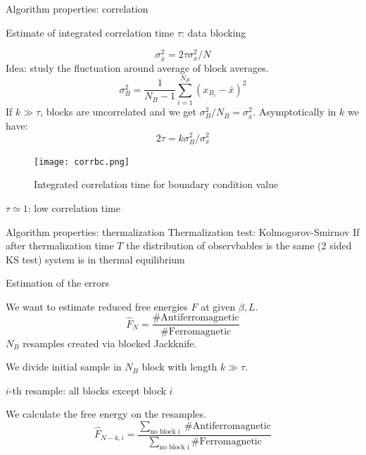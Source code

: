 \documentclass[12pt,handout]{beamer}
\begin{document}
\begin{frame}{Algorithm properties: correlation}
\begin{center}
Estimate of integrated correlation time $\tau$: data blocking

\[
	\sigma_{\bar{x}}^2 = 2\tau\sigma_{x}^2/N
\]
Idea: study the fluctuation around average of block averages.
\[
	\sigma _B ^2 = \frac{1}{N_B - 1}\sum_ {i = 1} ^{N_B} \left( x_{B_i} - \bar{x} \right)^2 
\]
If $k\gg\tau$, blocks are uncorrelated and we get $\sigma_B^2/N_B = \sigma_{\bar{x}}^2$.
Asymptotically in $k$ we have:
\[
	2\tau = k \sigma_B ^2/\sigma_{x}^2
\]
\end{center}
\end{frame}


\begin{frame}
\begin{center}
\begin{figure}
\centering
\texttt{[image: corrbc.png]}
\caption{Integrated correlation time for boundary condition value\label{fig:corr}}
\end{figure}
$\tau \simeq 1$: low correlation time
\end{center}
\end{frame}

\begin{frame}{Algorithm properties: thermalization}
Thermalization test: Kolmogorov-Smirnov
If after thermalization time $T$ the distribution of observbables is the same (2 sided KS test) system is in thermal equilibrium
\end{frame}

\begin{frame}{Estimation of the errors}
\begin{center}
We want to estimate reduced free energies $F$ at given $\beta, L$.
\[
	\hat{F}_N = \frac{\# \text{Antiferromagnetic}}{\# \text{Ferromagnetic}}
\]
$N_B$ resamples created via blocked Jackknife.

We divide initial sample in $N_B$ block with length $k\gg \tau$.

$i$-th resample: all blocks except block $i$

We calculate the free energy on the resamples.
\[
	\hat{F}_{N-k, i} = \frac{\sum_ { \mbox{no block i }} \# \text{Antiferromagnetic} }{\sum_ {\mbox{no block i}} \# \text{Ferromagnetic}}
\]

\end{center}
\end{frame}
\end{document}
